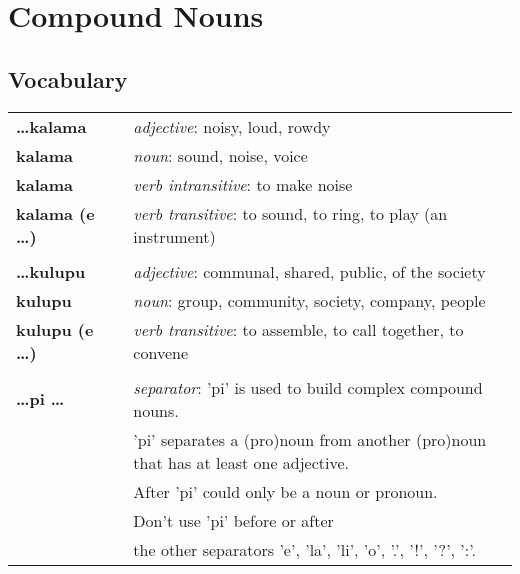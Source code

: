 
\section{Compound Nouns}
\subsection*{Vocabulary}
\begin{supertabular}{p{2,5cm}|ll}
    \textbf{\dots kalama}     &  & \textit{adjective}: noisy, loud, rowdy                               \\
    \textbf{kalama}           &  & \textit{noun}: sound, noise, voice                                   \\
    \textbf{kalama}           &  & \textit{verb intransitive}: to make noise                            \\
    \textbf{kalama (e \dots)} &  & \textit{verb transitive}: to sound, to ring, to play (an instrument) \\
                              &  &                                                                      \\
    \textbf{\dots kulupu}     &  & \textit{adjective}: communal, shared, public, of the society         \\
    \textbf{kulupu}           &  & \textit{noun}: group, community, society, company, people            \\
    \textbf{kulupu (e \dots)} &  & \textit{verb transitive}: to assemble, to call together, to convene  \\
                              &  &                                                                      \\
    \textbf{\dots pi \dots }  &  & \textit{separator}: 'pi' is used to build complex compound nouns.    \\ && 'pi' separates a (pro)noun from another (pro)noun that has at least one adjective. \\ && After 'pi' could only be a noun or pronoun. \\ && Don't use 'pi' before or after \\ && the other separators 'e', 'la', 'li', 'o', '.', '!', '?', ':'.  \\
\end{supertabular}

\newpage

